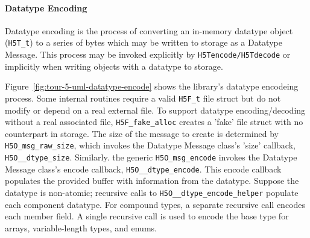 \paragraph{Datatype Encoding} Datatype encoding is the process of converting an in-memory datatype object (\texttt{H5T\_t}) to a series of bytes which may be written to storage as a Datatype Message. This process may be invoked explicitly by \texttt{H5Tencode/H5Tdecode} or implicitly when writing objects with a datatype to storage. 

Figure~\ref{fig:tour-5-uml-datatype-encode} shows the library's datatype encodeing process. Some internal routines require a valid \texttt{H5F\_t} file struct but do not modify or depend on a real external file. To support datatype encoding/decoding without a real associated file, \texttt{H5F\_fake\_alloc} creates a 'fake' file struct with no counterpart in storage. The size of the message to create is determined by \texttt{H5O\_msg\_raw\_size}, which invokes the Datatype Message class's  'size' callback, \texttt{H5O\_\_dtype\_size}. Similarly. the generic \texttt{H5O\_msg\_encode} invokes the Datatype Message class's encode callback, \texttt{H5O\_\_dtype\_encode}. This encode callback populates the provided buffer with information from the datatype. Suppose the datatype is non-atomic; recursive calls to \texttt{H5O\_\_dtype\_encode\_helper} populate each component datatype. For compound types, a separate recursive call encodes each member field. A single recursive call is used to encode the base type for arrays, variable-length types, and enums.

